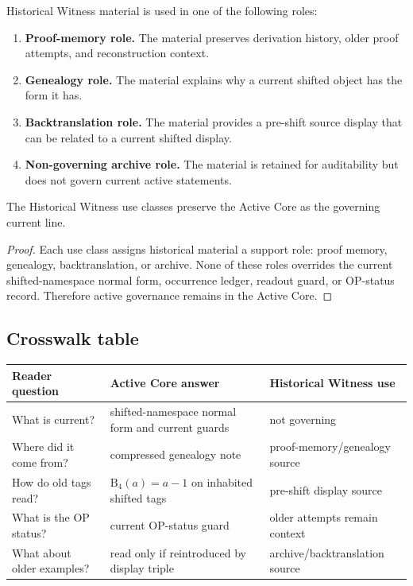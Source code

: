 \begin{definition}
\label{def:v405-historical-witness-use-classes}
Historical Witness material is used in one of the following roles:
\begin{enumerate}[leftmargin=*]
 \item \textbf{Proof-memory role.} The material preserves derivation history,
 older proof attempts, and reconstruction context.
 \item \textbf{Genealogy role.} The material explains why a current shifted object
 has the form it has.
 \item \textbf{Backtranslation role.} The material provides a pre-shift source
 display that can be related to a current shifted display.
 \item \textbf{Non-governing archive role.} The material is retained for
 auditability but does not govern current active statements.
\end{enumerate}
\end{definition}

\begin{lemma}
\label{lem:v405-witness-roles-preserve-active-governance}
The Historical Witness use classes preserve the Active Core as the governing
current line.
\end{lemma}

\begin{proof}
Each use class assigns historical material a support role: proof memory,
genealogy, backtranslation, or archive. None of these roles overrides the
current shifted-namespace normal form, occurrence ledger, readout guard, or OP-status record.
Therefore active governance remains in the Active Core.
\end{proof}

\subsection{Crosswalk table}
\label{subsec:v405-crosswalk-table}

\begin{center}
\scriptsize
\setlength{\tabcolsep}{2pt}
\begin{tabular}{@{}p{}P{0.31\textwidth}P{0.34\textwidth}@{}}
\toprule
Reader question & Active Core answer & Historical Witness use\\
\midrule
What is current? & shifted-namespace normal form and current guards & not governing\\
Where did it come from? & compressed genealogy note & proof-memory/genealogy source\\
How do old tags read? & $\mathrm B_4(a)=a-1$ on inhabited shifted tags & pre-shift display source\\
What is the OP status? & current OP-status guard & older attempts remain context\\
What about older examples? & read only if reintroduced by display triple & archive/backtranslation source\\
\bottomrule
\end{tabular}
\end{center}


